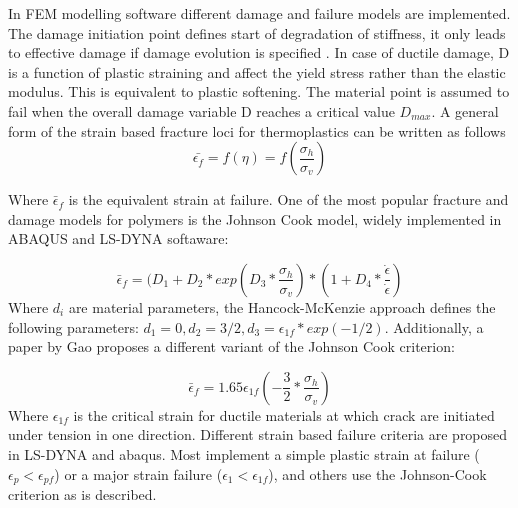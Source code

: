 In FEM modelling software different damage and failure models are implemented. The damage initiation point defines start of degradation of stiffness, it only leads to effective damage if damage evolution is specified \cite{ABAQUS2006MaterialFailure}. In case of ductile damage, D is a function of plastic straining and affect the yield stress rather than the elastic modulus. This is equivalent to plastic softening. The material point is assumed to fail when the overall damage variable D reaches a critical value $D_{max}$.
A general form of the strain based fracture loci for thermoplastics can be written as follows
\begin{equation}\label{AzziTsai}
\bar{\epsilon_f}=f(\eta)=f(\frac{\sigma_h}{\sigma_v})
\end{equation}

Where $\bar\epsilon_f$ is the equivalent strain at failure. 
One of the most popular fracture and damage models for polymers is the Johnson Cook model, widely implemented in ABAQUS and LS-DYNA softaware:

\begin{equation}\label{AzziTsai}
\bar\epsilon_f=(D_1+D_2*exp{(D_3*\frac{\sigma_h}{\sigma_v})}*(1+D_4*\frac{\dot{\epsilon}}{\dot{\epsilon}})
\end{equation}
Where $d_i$ are material parameters\cite{BoisA:}, the Hancock-McKenzie approach defines the following parameters: $d_1=0, d_2=3/2, d_3=\epsilon_{1f}*exp(-1/2)$. Additionally, a paper by Gao \cite{Gao2013CriticalPipelines} proposes a different variant of the Johnson Cook criterion:

\begin{equation}\label{eqn:JC}
\bar\epsilon_{f}=1.65\epsilon_{1f}{(-\frac{3}{2}*\frac{\sigma_h}{\sigma_v})}
\end{equation}Where $\epsilon_{1f}$ is the critical strain for ductile materials at which crack are initiated under tension in one direction. Different strain based failure criteria are proposed in LS-DYNA and abaqus. Most implement a simple plastic strain at failure ($\epsilon_p<\epsilon_{pf}$) or a major strain failure ($\epsilon_1<\epsilon_{1f}$), and others use the Johnson-Cook criterion as is described.  

